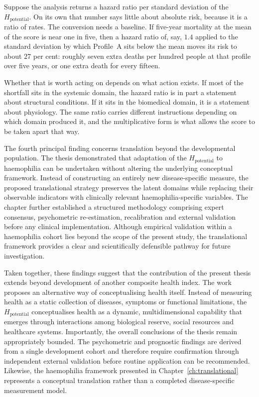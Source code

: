 \begin{reading}
Suppose the analysis returns a hazard ratio per standard deviation of the
$H_{\text{potential}}$. On its own that number says little about absolute risk,
because it is a ratio of rates. The conversion needs a baseline. If five-year
mortality at the mean of the score is near one in five, then a hazard ratio of,
say, $1.4$ applied to the standard deviation by which Profile~A sits below the
mean moves its risk to about $27$ per cent: roughly seven extra deaths per
hundred people at that profile over five years, or one extra death for every
fifteen.

Whether that is worth acting on depends on what action exists. If most of the
shortfall sits in the systemic domain, the hazard ratio is in part a statement
about structural conditions. If it sits in the biomedical domain, it is a
statement about physiology. The same ratio carries different instructions depending on
which domain produced it, and the multiplicative form is what allows the score to
be taken apart that way.
\end{reading}

The fourth principal finding concerns translation beyond the developmental population. The thesis demonstrated that adaptation of the $H_{\text{potential}}$ to haemophilia can be undertaken without altering the underlying conceptual framework. Instead of constructing an entirely new disease-specific measure, the proposed translational strategy preserves the latent domains while replacing their observable indicators with clinically relevant haemophilia-specific variables. The chapter further established a structured methodology comprising expert consensus, psychometric re-estimation, recalibration and external validation before any clinical implementation. Although empirical validation within a haemophilia cohort lies beyond the scope of the present study, the translational framework provides a clear and scientifically defensible pathway for future investigation.

Taken together, these findings suggest that the contribution of the present thesis extends beyond development of another composite health index. The work proposes an alternative way of conceptualising health itself. Instead of measuring health as a static collection of diseases, symptoms or functional limitations, the $H_{\text{potential}}$ conceptualises health as a dynamic, multidimensional capability that emerges through interactions among biological reserve, social resources and healthcare systems. Importantly, the overall conclusions of the thesis remain appropriately bounded. The psychometric and prognostic findings are derived from a single development cohort and therefore require confirmation through independent external validation before routine application can be recommended. Likewise, the haemophilia framework presented in Chapter~\ref{ch:translational} represents a conceptual translation rather than a completed disease-specific measurement model.

